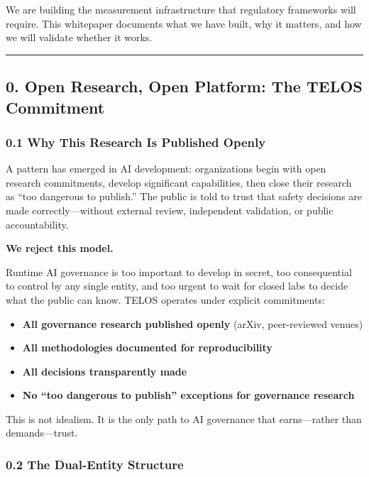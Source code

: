 We are building the measurement infrastructure that regulatory
frameworks will require. This whitepaper documents what we have built,
why it matters, and how we will validate whether it works.

\begin{center}\rule{0.5\linewidth}{0.5pt}\end{center}

\subsection{0. Open Research, Open Platform: The TELOS
Commitment}\label{open-research-open-platform-the-telos-commitment}

\subsubsection{0.1 Why This Research Is Published
Openly}\label{why-this-research-is-published-openly}

A pattern has emerged in AI development: organizations begin with open
research commitments, develop significant capabilities, then close their
research as ``too dangerous to publish.'' The public is told to trust
that safety decisions are made correctly---without external review,
independent validation, or public accountability.

\textbf{We reject this model.}

Runtime AI governance is too important to develop in secret, too
consequential to control by any single entity, and too urgent to wait
for closed labs to decide what the public can know. TELOS operates under
explicit commitments:

\begin{itemize}
\tightlist
\item
  \textbf{All governance research published openly} (arXiv,
  peer-reviewed venues)
\item
  \textbf{All methodologies documented for reproducibility}
\item
  \textbf{All decisions transparently made}
\item
  \textbf{No ``too dangerous to publish'' exceptions for governance
  research}
\end{itemize}

This is not idealism. It is the only path to AI governance that
earns---rather than demands---trust.

\subsubsection{0.2 The Dual-Entity
Structure}\label{the-dual-entity-structure}

